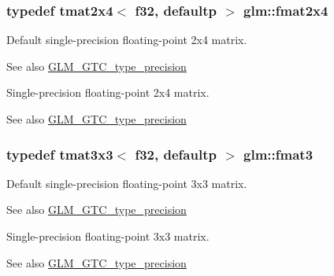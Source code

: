 \subsubsection[{fmat2x4}]{\setlength{\rightskip}{0pt plus 5cm}typedef tmat2x4$<$ f32, defaultp $>$ {\bf glm\+::fmat2x4}}\label{group__gtc__type__precision_ga76578ee3c2d6de9b46d0efd1c7060b85}
Default single-\/precision floating-\/point 2x4 matrix. \begin{DoxySeeAlso}{See also}
\hyperlink{group__gtc__type__precision}{G\+L\+M\+\_\+\+G\+T\+C\+\_\+type\+\_\+precision}
\end{DoxySeeAlso}
Single-\/precision floating-\/point 2x4 matrix. \begin{DoxySeeAlso}{See also}
\hyperlink{group__gtc__type__precision}{G\+L\+M\+\_\+\+G\+T\+C\+\_\+type\+\_\+precision} 
\end{DoxySeeAlso}
\hypertarget{group__gtc__type__precision_ga17dec8b2e3d19b235b0749b8ac9f2217}{}
\subsubsection[{fmat3}]{\setlength{\rightskip}{0pt plus 5cm}typedef tmat3x3$<$ f32, defaultp $>$ {\bf glm\+::fmat3}}\label{group__gtc__type__precision_ga17dec8b2e3d19b235b0749b8ac9f2217}
Default single-\/precision floating-\/point 3x3 matrix. \begin{DoxySeeAlso}{See also}
\hyperlink{group__gtc__type__precision}{G\+L\+M\+\_\+\+G\+T\+C\+\_\+type\+\_\+precision}
\end{DoxySeeAlso}
Single-\/precision floating-\/point 3x3 matrix. \begin{DoxySeeAlso}{See also}
\hyperlink{group__gtc__type__precision}{G\+L\+M\+\_\+\+G\+T\+C\+\_\+type\+\_\+precision} 
\end{DoxySeeAlso}
\hypertarget{group__gtc__type__precision_gab194ac1a68dbcb228384112ebe531c67}{}
